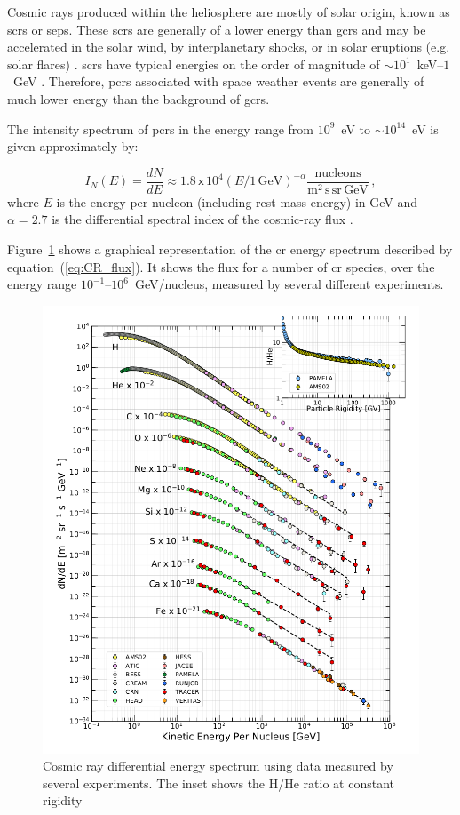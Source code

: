 Cosmic rays produced within the heliosphere are mostly of solar origin, known as \glspl{scr} or \glspl{sep}. These \glspl{scr} are generally of a lower energy than \glspl{gcr} and may be accelerated in the solar wind, by interplanetary shocks, or in solar eruptions (e.g. solar flares) \citep{giacalone_energetic_2010}. \glspl{scr} have typical energies on the order of magnitude of $\sim$$10^{1}$~keV--$1$~GeV \citep{chilingarian_galactic_2003, bruno_solar_2018}. Therefore, \glspl{pcr} associated with space weather events are generally of much lower energy than the background of \glspl{gcr}.

The intensity spectrum of \glspl{pcr} in the energy range from $10^9$~eV to $\sim10^{14}$~eV is given approximately by:

\begin{equation}
\label{eq:CR_flux}
I_N(E) = \frac{dN}{dE} \approx 1.8 \, \mathsf{x} \, 10^4 (E/1 \, \mathrm{GeV})^{-\alpha} \frac{\mathrm{nucleons}}{{\mathrm{m^2 \, s  \, sr \, GeV}}} \, ,
\end{equation}
%
where $E$ is the energy per nucleon (including rest mass energy) in GeV and $\alpha=2.7$ is the differential spectral index of the cosmic-ray flux \citep{particle_data_group_review_2020}. 

Figure~\ref{fig:CR_spec} shows a graphical representation of the \gls{cr} energy spectrum described by equation~(\ref{eq:CR_flux}). It shows the flux for a number of \gls{cr} species, over the energy range $10^{-1}$--$10^{6}$~GeV/nucleus, measured by several different experiments.

\begin{figure}[ht!]
	\centering
	\includegraphics[width=0.8\columnwidth]{CR_spectrum.png}
	\caption{ Cosmic ray differential energy spectrum using data measured by several experiments. The inset shows the H/He ratio at constant rigidity \citep{particle_data_group_review_2020} }
	\label{fig:CR_spec}
\end{figure}

